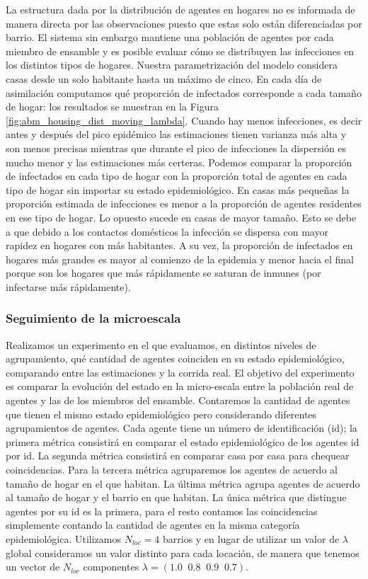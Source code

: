 La estructura dada por la distribución de agentes en hogares no es informada de manera directa por las observaciones puesto que estas solo están diferenciadas por barrio. El sistema sin embargo mantiene una población de agentes por cada miembro de ensamble y es posible evaluar cómo se distribuyen las infecciones en los distintos tipos de hogares. Nuestra parametrización del modelo considera casas desde un solo habitante hasta un máximo de cinco. En cada día de asimilación computamos qué proporción de infectados corresponde a cada tamaño de hogar: los resultados se muestran en la Figura \ref{fig:abm_housing_dist_moving_lambda}. Cuando hay menos infecciones, es decir antes y después del pico epidémico las estimaciones tienen varianza más alta y son menos precisas mientras que durante el pico de infecciones la dispersión es mucho menor y las estimaciones más certeras. Podemos comparar la proporción de infectados en cada tipo de hogar con la proporción total de agentes en cada tipo de hogar sin importar su estado epidemiológico. En casas más pequeñas la proporción estimada de infecciones es menor a la proporción de agentes residentes en ese tipo de hogar. Lo opuesto sucede en casas de mayor tamaño. Esto se debe a que debido a los contactos domésticos la infección se dispersa con mayor rapidez en hogares con más habitantes. A su vez, la proporción de infectados en hogares más grandes es mayor al comienzo de la epidemia y menor hacia el final porque son los hogares que más rápidamente se saturan de inmunes (por infectarse más rápidamente).

\subsubsection{Seguimiento de la microescala}

Realizamos un experimento en el que evaluamos, en distintos niveles de agrupamiento, qué cantidad de agentes coinciden en su estado epidemiológico,  comparando entre las estimaciones y la corrida real. El objetivo del experimento es comparar la evolución del estado en la micro-escala entre la población real de agentes y las de los miembros del ensamble. Contaremos la cantidad de agentes que tienen el mismo estado epidemiológico pero considerando diferentes agrupamientos de agentes. Cada agente tiene un número de identificación (id); la primera métrica consistirá en comparar el estado epidemiológico de los agentes id por id. La segunda métrica consistirá en comparar casa por casa para chequear coincidencias. Para la tercera métrica agruparemos los agentes de acuerdo al tamaño de hogar en el que habitan. La última métrica agrupa agentes de acuerdo al tamaño de hogar y el barrio en que habitan. La única métrica que distingue agentes por su id es la primera, para el resto contamos las coincidencias simplemente contando la cantidad de agentes en la misma categoría epidemiológica. Utilizamos $N_{loc} = 4$ barrios y en lugar de utilizar un valor de $\lambda$ global consideramos un valor distinto para cada locación, de manera que tenemos un vector de $N_{loc}$ componentes $\lambda = (1.0\;\; 0.8\;\; 0.9\;\; 0.7)$. 

